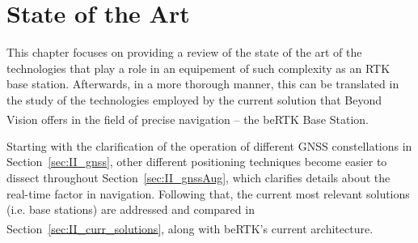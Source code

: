 

\glsresetall
\chapter{State of the Art}\label{cha:chapter2_SotA}

This chapter focuses on providing a review of the state of the art of the technologies that play a role in an equipement of such complexity as an RTK base station. Afterwards, in a more thorough manner, this can be translated in the study of the technologies employed by the current solution that Beyond Vision offers in the field of precise navigation -- the beRTK\textsuperscript{\textregistered} Base Station.

Starting with the clarification of the operation of different GNSS constellations in Section~\ref{sec:II_gnss}, other different positioning techniques become easier to dissect throughout Section~\ref{sec:II_gnssAug}, which clarifies details about the real-time factor in navigation.
Following that, the current most relevant solutions (i.e. base stations) are addressed and compared in Section~\ref{sec:II_curr_solutions}, along with beRTK\textsuperscript{\textregistered}'s current architecture.





